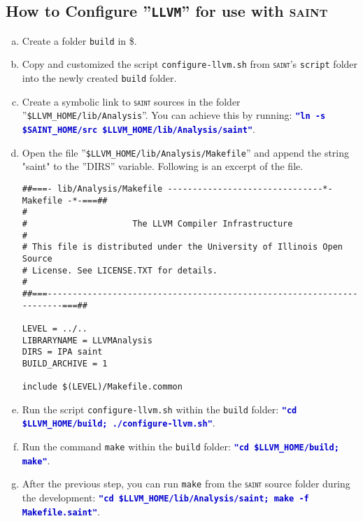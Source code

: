 \documentclass[12pt,onecolumn,a4paper]{article}
\newcommand{\saint}{\texttt{\textsc{saint}}\xspace}
\newcommand{\tool}[1]{\texttt{#1}\xspace}
\newcommand{\command}[1]{\textcolor{mediumblue}{\texttt{\textbf{"#1"}}}\xspace}
\newcommand{\script}[1]{\texttt{#1}\xspace}
\newcommand{\envout}[1]{\textcolor{firebrickred}{\$\text{#1}}\xspace}
\begin{document}
\subsection{How to Configure ''\tool{LLVM}'' for use with \textsc{saint}}
\begin{enumerate}[a)]
	\item Create a folder \texttt{build} in \envout{LLVM\_HOME}.

	\item Copy and customized the script \script{configure-llvm.sh}
	from \saint's \texttt{script} folder into the newly created 
	\texttt{build} folder.

	\item Create a symbolic link to \saint sources in the folder
	''\texttt{\$LLVM\_HOME/lib/Analysis}''.
	You can achieve this by running: 
	\command{ln -s \$SAINT\_HOME/src \$LLVM\_HOME/lib/Analysis/saint}.
	
	\item Open the file ''\texttt{\$LLVM\_HOME/lib/Analysis/Makefile}'' and
	append the string "saint" to the ''DIRS'' variable.
	Following is an excerpt of the file.\\
	
	\begin{verbatim}
##===- lib/Analysis/Makefile -------------------------------*- Makefile -*-===##
#
#                     The LLVM Compiler Infrastructure
#
# This file is distributed under the University of Illinois Open Source
# License. See LICENSE.TXT for details.
#
##===----------------------------------------------------------------------===##

LEVEL = ../..
LIBRARYNAME = LLVMAnalysis
DIRS = IPA saint
BUILD_ARCHIVE = 1

include $(LEVEL)/Makefile.common
	\end{verbatim}		
	
	\item Run the script \script{configure-llvm.sh} within the \texttt{build}
	folder: \command{cd \$LLVM\_HOME/build; ./configure-llvm.sh}.
	
	\item Run the command \texttt{make} within the \texttt{build} folder: 
	\command{cd \$LLVM\_HOME/build; make}.
	
	\item After the previous step, you can run \texttt{make} from the \saint
	source folder during the development:	
	\command{cd \$LLVM\_HOME/lib/Analysis/saint; make -f Makefile.saint}.
\end{enumerate}
\end{document}
